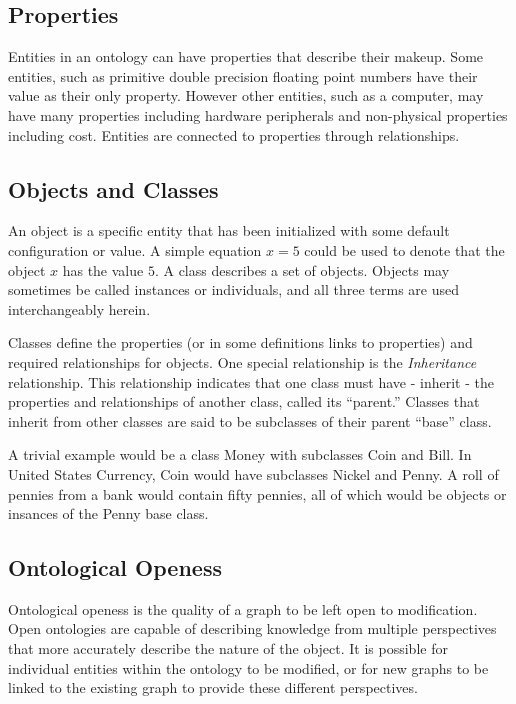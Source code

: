 \subsection{Properties}

Entities in an ontology can have properties that describe their makeup. Some
entities, such as primitive double precision floating point numbers have their
value as their only property. However other entities, such as a computer, may
have many properties including hardware peripherals and non-physical properties
including cost. Entities are connected to properties through relationships.

\subsection{Objects and Classes}

An object is a specific entity that has been initialized with some default
configuration or value. A simple equation $x = 5$ could be used to denote that
the object $x$ has the value $5$. A class describes a set of objects. Objects
may sometimes be called instances or individuals, and all three terms are used
interchangeably herein.

Classes define the properties (or in some definitions links to properties) and
required relationships for objects. One special relationship is the
\textit{Inheritance} relationship. This relationship indicates that one class
must have - inherit - the properties and relationships of another class, called
its ``parent.'' Classes that inherit from other classes are said to be
subclasses of their parent ``base'' class.

A trivial example would be a class Money with subclasses Coin and Bill. In
United States Currency, Coin would have subclasses Nickel and Penny. A roll of
pennies from a bank would contain fifty pennies, all of which would be objects
or insances of the Penny base class.

\subsection{Ontological Openess}
\label{ont-openess}

Ontological openess is the quality of a graph to be left open to modification.
Open ontologies are capable of describing knowledge from multiple perspectives
that more accurately describe the nature of the object. It is possible for
individual entities within the ontology to be modified, or for new graphs to be
linked to the existing graph to provide these different perspectives.


